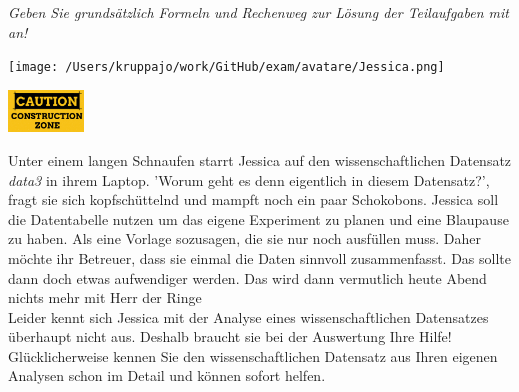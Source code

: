 \documentclass[a4paper, 9pt]{scrartcl}\usepackage[]{graphicx}\usepackage[]{xcolor}
\begin{document}
\textit{Geben Sie grundsätzlich Formeln und Rechenweg zur Lösung der Teilaufgaben mit an!} \\[1Ex]
 

 
\begin{minipage}[t]{0.5\textwidth}
\texttt{[image: /Users/kruppajo/work/GitHub/exam/avatare/Jessica.png]}
\end{minipage}
\begin{minipage}[t]{0.5\textwidth}
\hfill
\href{https://youtu.be/C9skfFRTHhI}{\includegraphics[width = 2cm]{img/caution}}
\end{minipage}
\vspace{1ex}



Unter einem langen Schnaufen starrt Jessica auf den wissenschaftlichen Datensatz \textit{data3} in ihrem Laptop. 'Worum geht es denn eigentlich in diesem Datensatz?', fragt sie sich kopfschüttelnd und mampft noch ein paar Schokobons. Jessica soll die Datentabelle nutzen um das eigene Experiment zu planen und eine Blaupause zu haben. Als eine Vorlage sozusagen, die sie nur noch ausfüllen muss. Daher möchte ihr Betreuer, dass sie einmal die Daten sinnvoll zusammenfasst. Das sollte dann doch etwas aufwendiger werden. Das wird dann vermutlich heute Abend nichts mehr mit Herr der Ringe\\

Leider kennt sich Jessica mit der Analyse eines wissenschaftlichen Datensatzes überhaupt nicht aus. Deshalb braucht sie bei der Auswertung Ihre Hilfe! Glücklicherweise kennen Sie den wissenschaftlichen Datensatz aus Ihren eigenen Analysen schon im Detail und können sofort helfen.
\end{document}
